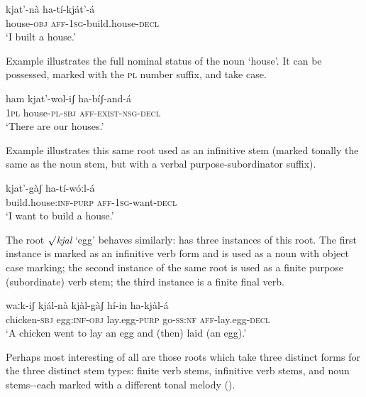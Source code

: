 \documentclass[output=paper]{langsci/langscibook}
\begin{document}
\ea\label{ex:mahland:16}
\gll kjat'-nà       ha-tí-kját'-{\downstep}á\\
house\textsc{{}-obj}   \textsc{aff-1sg}{}-build.house\textsc{{}-decl} \\
\glt `I built a house.'
\z

Example  illustrates the full nominal status of the noun `house'. It can be possessed, marked with the \textsc{pl} number suffix, and take case. 

\ea\label{ex:mahland:17}
\gll ham   kjat'-wol-iʃ       ha-bíʃ-and-á\\
\textsc{1pl}    house-\textsc{pl-sbj}    \textsc{aff-exist-nsg-decl} \\
\glt `There are our houses.'
\z

Example  illustrates this same root used as an infinitive stem (marked tonally the same as the noun stem, but with a verbal purpose-subordinator suffix).

\ea\label{ex:mahland:18}
\gll kjat'-gàʃ                    ha-tí-wóːl-{\downstep}á\\
build.house:\textsc{inf-purp}   \textsc{aff-1sg}{}-want-\textsc{decl} \\
\glt `I want to build a house.'
\z

The root \textit{${\surd}$kjal} `egg' behaves similarly:  has three instances of this root. The first instance is marked as an infinitive verb form and is used as a noun with object case marking; the second instance of the same root is used as a finite purpose (subordinate) verb stem; the third instance is a finite final verb. 

\ea\label{ex:mahland:19}
\gll waːk-iʃ          kjál-nà         kjàl-gàʃ         hí-in    ha-kjàl-á
   \\
chicken-\textsc{sbj}   egg:\textsc{inf-obj}   lay.egg\textsc{{}-purp}  go\textsc{{}-ss:nf} \textsc{aff}{}-lay.egg-\textsc{decl} \\
\glt `A chicken went to lay an egg and (then) laid (an egg).'
\z

Perhaps most interesting of all are those roots which take three distinct forms for the three distinct stem types: finite verb stems, infinitive verb stems, and noun stems-{}-each marked with a different tonal melody ().
\end{document}
